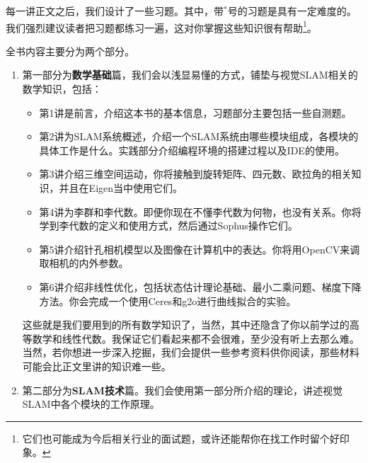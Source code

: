 每一讲正文之后，我们设计了一些习题。其中，带$^*$号的习题是具有一定难度的。我们强烈建议读者把习题都练习一遍，这对你掌握这些知识很有帮助\footnote{它们也可能成为今后相关行业的面试题，或许还能帮你在找工作时留个好印象。}。

全书内容主要分为两个部分。
\begin{enumerate}
\item 第一部分为\textbf{数学基础}篇，我们会以浅显易懂的方式，铺垫与视觉SLAM相关的数学知识，包括：

\begin{itemize}[leftmargin=1.5em]
	\item 第1讲是前言，介绍这本书的基本信息，习题部分主要包括一些自测题。
	\item 第2讲为SLAM系统概述，介绍一个SLAM系统由哪些模块组成，各模块的具体工作是什么。实践部分介绍编程环境的搭建过程以及IDE的使用。
	\item 第3讲介绍三维空间运动，你将接触到旋转矩阵、四元数、欧拉角的相关知识，并且在Eigen当中使用它们。
	\item 第4讲为李群和李代数。即便你现在不懂李代数为何物，也没有关系。你将学到李代数的定义和使用方式，然后通过Sophus操作它们。
	\item 第5讲介绍针孔相机模型以及图像在计算机中的表达。你将用OpenCV来调取相机的内外参数。
	\item 第6讲介绍非线性优化，包括状态估计理论基础、最小二乘问题、梯度下降方法。你会完成一个使用Ceres和g2o进行曲线拟合的实验。
\end{itemize}

这些就是我们要用到的所有数学知识了，当然，其中还隐含了你以前学过的高等数学和线性代数。我保证它们看起来都不会很难，至少没有听上去那么难。当然，若你想进一步深入挖掘，我们会提供一些参考资料供你阅读，那些材料可能会比正文里讲的知识难一些。

\item 第二部分为\textbf{SLAM技术}篇。我们会使用第一部分所介绍的理论，讲述视觉SLAM中各个模块的工作原理。


\end{enumerate}
